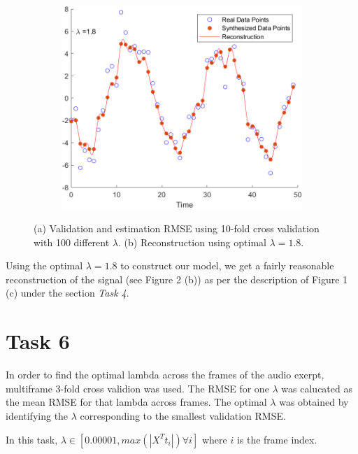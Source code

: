 \documentclass{article}
\begin{document}
\begin{figure}[h]
\begin{subfigure}{0.49\linewidth}
   \includegraphics[width=\linewidth]{task52.png}
   \caption{}
   \label{fig:2}
\end{subfigure}
\caption{(a) Validation and estimation RMSE using 10-fold cross validation with 100 different $\lambda$. (b) Reconstruction using optimal $\lambda = 1.8$.}
\end{figure}
Using the optimal $\lambda = 1.8$ to construct our model, we get a fairly reasonable reconstruction of the signal (see Figure 2 (b)) as per the description of Figure 1 (c) under the section \textit{Task 4}.

\section{Task 6}
In order to find the optimal lambda across the frames of the audio exerpt, multiframe 3-fold cross validion was used. The RMSE for one $\lambda$ was calucated as the mean RMSE for that lambda across frames. The optimal $\lambda$ was obtained by identifying the $\lambda$ corresponding to the smallest validation RMSE.

In this task, $\lambda \in [0.00001, max(|X^T t_i|) \forall i]$ where $i$ is the frame index.
\end{document}
